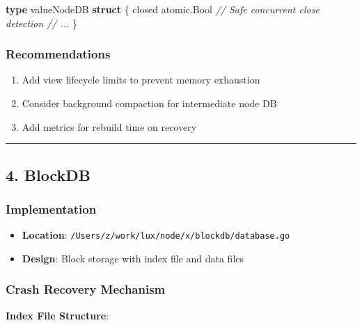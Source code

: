 \documentclass[
]{article}
\newenvironment{Shaded}{}{}
\newcommand{\CommentTok}[1]{\textcolor[rgb]{0.38,0.63,0.69}{\textit{#1}}}
\newcommand{\KeywordTok}[1]{\textcolor[rgb]{0.00,0.44,0.13}{\textbf{#1}}}
\newcommand{\NormalTok}[1]{#1}
\newcommand{\OperatorTok}[1]{\textcolor[rgb]{0.40,0.40,0.40}{#1}}
\providecommand{\tightlist}{%
  \setlength{\itemsep}{0pt}\setlength{\parskip}{0pt}}
\begin{document}
\begin{Shaded}
\begin{Highlighting}[]
\KeywordTok{type}\NormalTok{ valueNodeDB }\KeywordTok{struct} \OperatorTok{\{}
\NormalTok{    closed atomic}\OperatorTok{.}\NormalTok{Bool  }\CommentTok{// Safe concurrent close detection}
    \CommentTok{// ...}
\OperatorTok{\}}
\end{Highlighting}
\end{Shaded}

\subsubsection{Recommendations}\label{recommendations-2}

\begin{enumerate}
\def\labelenumi{\arabic{enumi}.}
\tightlist
\item
  Add view lifecycle limits to prevent memory exhaustion
\item
  Consider background compaction for intermediate node DB
\item
  Add metrics for rebuild time on recovery
\end{enumerate}

\begin{center}\rule{0.5\linewidth}{0.5pt}\end{center}

\subsection{4. BlockDB}\label{4-blockdb}

\subsubsection{Implementation}\label{implementation-3}

\begin{itemize}
\tightlist
\item
  \textbf{Location}:
  \texttt{/Users/z/work/lux/node/x/blockdb/database.go}
\item
  \textbf{Design}: Block storage with index file and data files
\end{itemize}

\subsubsection{Crash Recovery
Mechanism}\label{crash-recovery-mechanism-1}

\textbf{Index File Structure}:
\end{document}

